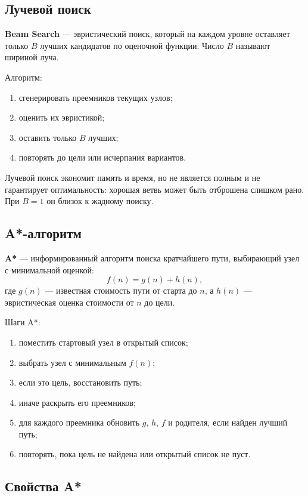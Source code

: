 \subsection*{Лучевой поиск}

\textbf{Beam Search} --- эвристический поиск, который на каждом уровне оставляет только $B$ лучших кандидатов по оценочной функции. Число $B$ называют шириной луча.

Алгоритм:
\begin{enumerate}
    \item сгенерировать преемников текущих узлов;
    \item оценить их эвристикой;
    \item оставить только $B$ лучших;
    \item повторять до цели или исчерпания вариантов.
\end{enumerate}

Лучевой поиск экономит память и время, но не является полным и не гарантирует оптимальность: хорошая ветвь может быть отброшена слишком рано. При $B=1$ он близок к жадному поиску.

\subsection*{A*-алгоритм}

\textbf{A*} --- информированный алгоритм поиска кратчайшего пути, выбирающий узел с минимальной оценкой:
\[
f(n)=g(n)+h(n),
\]
где $g(n)$ --- известная стоимость пути от старта до $n$, а $h(n)$ --- эвристическая оценка стоимости от $n$ до цели.

Шаги A*:
\begin{enumerate}
    \item поместить стартовый узел в открытый список;
    \item выбрать узел с минимальным $f(n)$;
    \item если это цель, восстановить путь;
    \item иначе раскрыть его преемников;
    \item для каждого преемника обновить $g$, $h$, $f$ и родителя, если найден лучший путь;
    \item повторять, пока цель не найдена или открытый список не пуст.
\end{enumerate}

\subsection*{Свойства A*}

